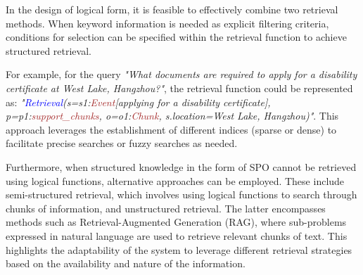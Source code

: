 \documentclass{article}
\begin{document}
In the design of logical form, it is feasible to effectively combine two retrieval methods. When keyword information is needed as explicit filtering criteria, conditions for selection can be specified within the retrieval function to achieve structured retrieval. 

For example, for the query \textit{"What documents are required to apply for a disability certificate at West Lake, Hangzhou?"}, the retrieval function could be represented as: \textit{"\textcolor{blue}{Retrieval}(s=s1:\textcolor{brown}{Event}[applying for a disability certificate], p=p1:\textcolor{brown}{support\_chunks}, o=o1:\textcolor{brown}{Chunk}, s.location=West Lake, Hangzhou)"}. This approach leverages the establishment of different indices (sparse or dense) to facilitate precise searches or fuzzy searches as needed.

Furthermore, when structured knowledge in the form of SPO cannot be retrieved using logical functions, alternative approaches can be employed. These include semi-structured retrieval, which involves using logical functions to search through chunks of information, and unstructured retrieval. The latter encompasses methods such as Retrieval-Augmented Generation (RAG), where sub-problems expressed in natural language are used to retrieve relevant chunks of text. This highlights the adaptability of the system to leverage different retrieval strategies based on the availability and nature of the information.
\end{document}
